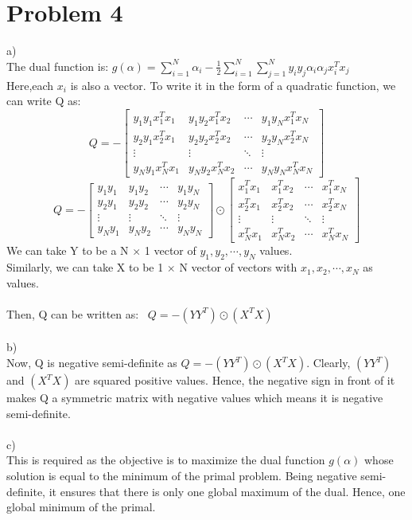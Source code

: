 \documentclass[10pt, a4paper, fleqn]{article}
\begin{document}
\section{Problem 4}
a)
\\The dual function is: $g(\alpha) = \sum\limits_{i=1}^{N}{\alpha_i} - \frac{1}{2} \sum\limits_{i=1}^{N}\sum\limits_{j=1}^{N}{y_iy_j\alpha_i\alpha_jx_i^T x_j} $ \\
Here,each $x_i$ is also a vector. To write it in the form of a quadratic function, we can write Q as:
\[ Q = -
\begin{bmatrix}
y_1y_1x_1^Tx_1&y_1y_2 x_1^Tx_2&\cdots &y_1y_Nx_1^Tx_N \\
y_2y_1x_2^Tx_1&y_2y_2x_2^Tx_2&\cdots &y_2y_Nx_2^Tx_N \\
\vdots & \vdots & \ddots & \vdots\\
y_Ny_1x_N^Tx_1&y_Ny_2x_N^Tx_2&\cdots &y_Ny_Nx_N^Tx_N
\end{bmatrix}\]
\[ Q = -
\begin{bmatrix}
y_1y_1&y_1y_2 &\cdots &y_1y_N\\
y_2y_1&y_2y_2&\cdots &y_2y_N \\
\vdots & \vdots & \ddots & \vdots\\
y_Ny_1&y_Ny_2&\cdots &y_Ny_N
\end{bmatrix}
\odot
\begin{bmatrix}
x_1^Tx_1&x_1^Tx_2&\cdots &x_1^Tx_N \\
x_2^Tx_1&x_2^Tx_2&\cdots &x_2^Tx_N \\
\vdots & \vdots & \ddots & \vdots\\
x_N^Tx_1&x_N^Tx_2&\cdots &x_N^Tx_N
\end{bmatrix}\]
We can take Y to be a N $\times$ 1 vector of $y_1, y_2, \cdots , y_N$ values. \\
Similarly, we can take X to be 1 $\times$ N vector of vectors with $x_1,x_2, \cdots , x_N$ as values.\\ \\
Then, Q can be written as: \ $Q = -(YY^T) \odot (X^T X)$
\\
\\
b)\\
Now, Q is negative semi-definite as $Q = -(YY^T) \odot (X^T X)$. Clearly, $(YY^T)$ and $(X^T X)$ are squared positive values. Hence, the negative sign in front of it makes Q a symmetric matrix with negative values which means it is negative semi-definite.\\ \\
c)\\
This is required as the objective is to maximize the dual function $g(\alpha)$ whose solution is equal to the minimum of the primal problem. Being negative semi-definite, it ensures that there is only one global maximum of the dual. Hence, one global minimum of the primal.
\end{document}
